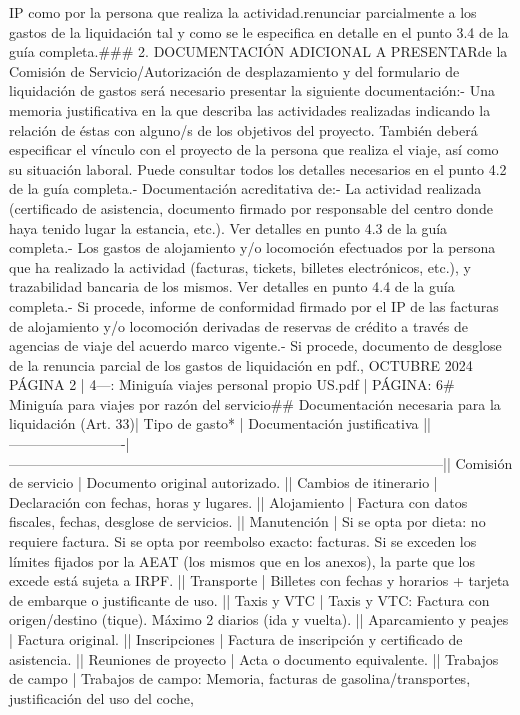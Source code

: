 \documentclass{article}
\begin{document}
\begin{itemize}
{IP como por la persona que realiza la actividad.\n{} renunciar parcialmente a los gastos de la liquidación tal y como se le especifica en detalle en el punto 3.4 de la guía completa.\n\n### 2. DOCUMENTACIÓN ADICIONAL A PRESENTAR\n{} de la Comisión de Servicio/Autorización de desplazamiento y del formulario de liquidación de gastos será necesario presentar la siguiente documentación:\n\n- Una memoria justificativa en la que describa las actividades realizadas indicando la relación de éstas con alguno/s de los objetivos del proyecto. También deberá especificar el vínculo con el proyecto de la persona que realiza el viaje, así como su situación laboral. Puede consultar todos los detalles necesarios en el punto 4.2 de la guía completa.\n\n- Documentación acreditativa de:\n- La actividad realizada (certificado de asistencia, documento firmado por responsable del centro donde haya tenido lugar la estancia, etc.). Ver detalles en punto 4.3 de la guía completa.\n- Los gastos de alojamiento y/o locomoción efectuados por la persona que ha realizado la actividad (facturas, tickets, billetes electrónicos, etc.), y trazabilidad bancaria de los mismos. Ver detalles en punto 4.4 de la guía completa.\n- Si procede, informe de conformidad firmado por el IP de las facturas de alojamiento y/o locomoción derivadas de reservas de crédito a través de agencias de viaje del acuerdo marco vigente.\n- Si procede, documento de desglose de la renuncia parcial de los gastos de liquidación en pdf.\n{}, OCTUBRE 2024    PÁGINA 2 | 4\n\n---\n\nFUENTE: Miniguía viajes personal propio US.pdf | PÁGINA: 6\n# Miniguía para viajes por razón del servicio\n\n## Documentación necesaria para la liquidación (Art. 33)\n\n| Tipo de gasto*           | Documentación justificativa                                                                 |\n|-------------------------|---------------------------------------------------------------------------------------------|\n| Comisión de servicio     | Documento original autorizado.                                                              |\n| Cambios de itinerario    | Declaración con fechas, horas y lugares.                                                  |\n| Alojamiento              | Factura con datos fiscales, fechas, desglose de servicios.                                 |\n| Manutención              | Si se opta por dieta: no requiere factura. Si se opta por reembolso exacto: facturas. Si se exceden los límites fijados por la AEAT (los mismos que en los anexos), la parte que los excede está sujeta a IRPF. |\n| Transporte               | Billetes con fechas y horarios + tarjeta de embarque o justificante de uso.               |\n| Taxis y VTC              | Taxis y VTC: Factura con origen/destino (tique). Máximo 2 diarios (ida y vuelta).        |\n| Aparcamiento y peajes    | Factura original.                                                                          |\n| Inscripciones            | Factura de inscripción y certificado de asistencia.                                        |\n| Reuniones de proyecto    | Acta o documento equivalente.                                                              |\n| Trabajos de campo        | Trabajos de campo: Memoria, facturas de gasolina/transportes, justificación del uso del coche, }
\end{itemize}
\end{document}
